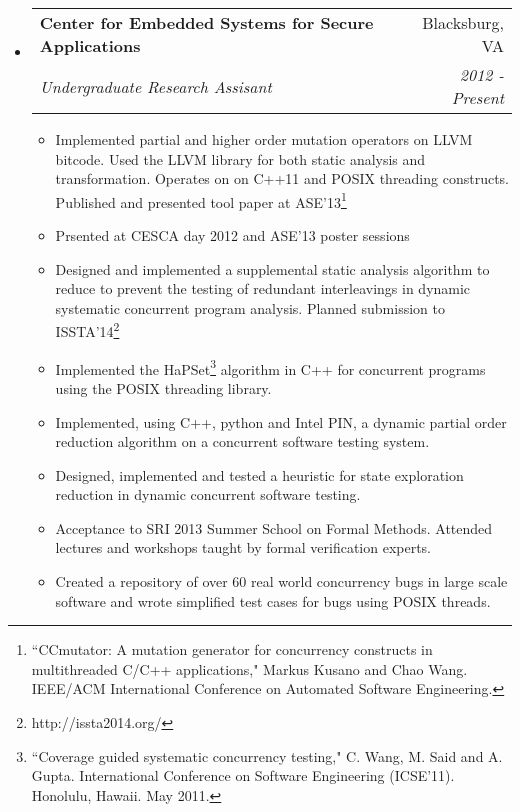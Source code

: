 \documentclass[letterpaper,11pt]{article}
\makeatletter
\newcommand{\resitem}[1]{\item #1 \vspace{-2pt}}
\newcommand{\resheading}[1]{{\large \parashade[.9]{sharpcorners}{\textbf{#1 \vphantom{p\^{E}}}}}}
\newcommand{\ressubheading}[4]{
\begin{tabular*}{6.5in}{l@{\extracolsep{\fill}}r}
		\textbf{#1} & #2 \\
		\textit{#3} & \textit{#4} \\
\end{tabular*}\vspace{-6pt}}
\makeatother
\begin{document}
\resheading{Research Experience}
\begin{itemize}
\item
    \ressubheading{Center for Embedded Systems for Secure Applications}{Blacksburg, VA}{Undergraduate Research Assisant}{2012 - Present}
    \begin{itemize}
        \resitem{Implemented partial and higher order mutation operators on
          LLVM bitcode. Used the LLVM library for both static analysis and
          transformation. Operates on on C++11 and POSIX threading constructs.
          Published and presented tool paper at ASE'13\footnote{``CCmutator: A mutation
          generator for concurrency constructs in multithreaded C/C++
          applications," Markus Kusano and Chao Wang. IEEE/ACM International
          Conference on Automated Software Engineering.}}
        \resitem{Prsented at CESCA day 2012 and ASE'13 poster sessions}
        \resitem{Designed and implemented a supplemental static analysis
          algorithm to reduce to prevent the testing of redundant interleavings
          in dynamic systematic concurrent program analysis. Planned submission
          to ISSTA'14\footnote{http://issta2014.org/}}
        \resitem{Implemented the HaPSet\footnote{``Coverage guided systematic
        concurrency testing," C. Wang, M. Said and A. Gupta. International
        Conference on Software Engineering (ICSE'11). Honolulu, Hawaii. May 2011.}
        algorithm in C++ for concurrent programs using the POSIX threading
        library.}
        \resitem{Implemented, using C++, python and Intel PIN, a dynamic
        partial order reduction algorithm on a concurrent software testing
        system.}
        \resitem{Designed, implemented and tested a heuristic for state
        exploration reduction in dynamic concurrent software testing.}
        \resitem{Acceptance to SRI 2013 Summer School on Formal Methods.
        Attended lectures and workshops taught by formal verification experts.}
        \resitem{Created a repository of over 60 real world concurrency bugs in
        large scale software and wrote simplified test cases for bugs using
        POSIX threads.}
    \end{itemize}
\end{itemize}
\end{document}
